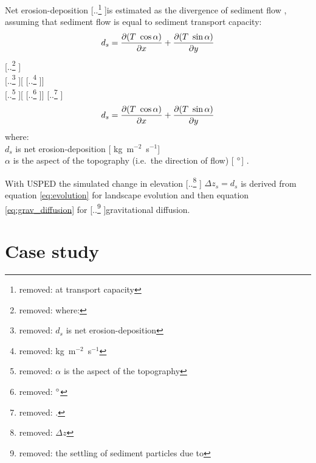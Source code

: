 \documentclass[gmd, manuscript]{copernicus}
\providecommand{\DIFadd}[1]{{\protect\color{blue} \sf #1}} %
\providecommand{\DIFdel}[1]{{\protect\color{red} [..\footnote{removed: #1} ]}} %
\providecommand{\DIFaddbegin}{} %
\providecommand{\DIFaddend}{} %
\providecommand{\DIFdelbegin}{} %
\providecommand{\DIFdelend}{} %
\begin{document}
\noindent
Net erosion-deposition \DIFdelbegin \DIFdel{at transport capacity }\DIFdelend is estimated as the divergence of sediment flow\DIFaddbegin \DIFadd{, 
assuming that sediment flow is equal to sediment transport capacity}\DIFaddend : 
\DIFdelbegin \begin{displaymath}\label{eq:usped_erdep} 
d_s = 
{\partial (T ~ \cos \alpha) \over \partial x} +
{\partial (T ~ \sin \alpha) \over \partial y}
\end{displaymath}
{\DIFdel{\small
\noindent
where: }\\
\DIFdel{\hspace*{0.5em} $d_s$ is net erosion-deposition }[\DIFdel{\unit{kg~m}$^{-2}$~\unit{s}$^{-1}$}]\\
\DIFdel{\hspace*{0.5em} $\alpha$ is the aspect of the topography }[\DIFdel{$^{\circ}$}]\DIFdel{.}\\
}
\DIFdelend \DIFaddbegin \begin{equation}\label{eq:usped_erdep} 
d_s = 
{\partial (T ~ \cos \alpha) \over \partial x} +
{\partial (T ~ \sin \alpha) \over \partial y}
\end{equation}
{\DIFadd{\small
\noindent
where: }\\
\DIFadd{\hspace*{0.5em} $d_s$ is net erosion-deposition }[\DIFadd{\unit{kg~m}$^{-2}$~\unit{s}$^{-1}$}]\\
\DIFadd{\hspace*{0.5em} $\alpha$ is the aspect of the topography (i.e.~the direction of flow) }[\DIFadd{$^{\circ}$}]\DIFadd{.}\\
}
\DIFaddend 

\noindent
With USPED the simulated change in elevation \DIFdelbegin \DIFdel{$\Delta z$
}\DIFdelend \DIFaddbegin \DIFadd{$\Delta z_s=d_s$
}\DIFaddend is derived from equation \ref{eq:evolution} for landscape evolution
and then equation \ref{eq:grav_diffusion}
for \DIFdelbegin \DIFdel{the settling of sediment particles due to }\DIFdelend gravitational diffusion.


\section{Case study} 
\end{document}
